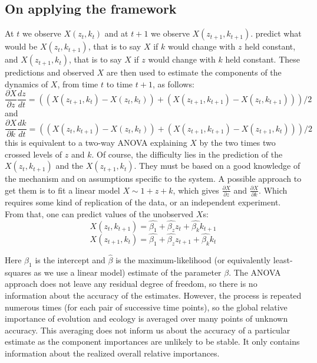 \subsection{On applying the framework}
At $t$ we observe $X(z_t,k_t)$ and at $t+1$ we observe $X(z_{t+1},k_{t+1})$. \citet{Becks2012} predict what would be $X(z_t,k_{t+1})$, that is to say $X$ if $k$ would change with $z$ held constant, and $X(z_{t+1},k_{t})$, that is to say $X$ if $z$ would change with $k$ held constant. These predictions and observed $X$ are then used to estimate the components of the dynamics of $X$, from time $t$ to time $t+1$, as follows:
\begin{equation}
\frac{\partial X}{\partial z}\frac{dz}{dt}=((X(z_{t+1},k_{t})-X(z_{t},k_{t}))+(X(z_{t+1},k_{t+1})-X(z_{t},k_{t+1})))/2
\end{equation}
and 
\begin{equation}
\frac{\partial X}{\partial k}\frac{dk}{dt}=((X(z_{t},k_{t+1})-X(z_{t},k_{t}))+(X(z_{t+1},k_{t+1})-X(z_{t+1},k_{t})))/2
\end{equation}
this is equivalent to a two-way ANOVA explaining $X$ by the two times two crossed levels of $z$ and $k$. 
Of course, the difficulty lies in the prediction of the $X(z_{t},k_{t+1})$ and the $X(z_{t+1},k_{t})$. They must be based on a good knowledge of the mechanism and on assumptions specific to the system. A possible approach to get them is to fit a linear model $X \sim 1 + z + k$, which gives $\frac{\partial X}{\partial z}$ and $\frac{\partial X}{\partial k}$. Which requires some kind of replication of the data, or an independent experiment. From that, one can predict values of the unobserved $X$s:
\begin{equation}
X(z_{t},k_{t+1})=\hat{\beta_1}+\hat{\beta_z}z_{t}+\hat{\beta_k}k_{t+1}
\end{equation}
\begin{equation}
X(z_{t+1},k_{t})=\hat{\beta_1}+\hat{\beta_z}z_{t+1}+\hat{\beta_k}k_{t}
\end{equation}


Here $\beta_1$ is the intercept and $\hat{\beta}$ is the maximum-likelihood (or equivalently least-squares as we use a linear model) estimate of the parameter $\beta$. The ANOVA approach does not leave any residual degree of freedom, so there is no information about the accuracy of the estimates. However, the process is repeated numerous times (for each pair of successive time points), so the global relative importance of evolution and ecology is averaged over many points of unknown accuracy. This averaging does not inform us about the accuracy of a particular estimate as the component importances are unlikely to be stable. It only contains information about the realized overall relative importances.

